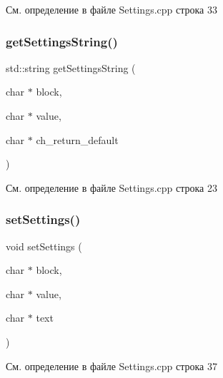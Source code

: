 См. определение в файле Settings.\+cpp строка 33

\mbox{\label{group__settingsh_ga3a0f1e87eb01bdd16c4a7e365aa283eb}} 
\subsubsection{\texorpdfstring{get\+Settings\+String()}{getSettingsString()}}
{\footnotesize\ttfamily std\+::string get\+Settings\+String (\begin{DoxyParamCaption}\item[{char $\ast$}]{block,  }\item[{char $\ast$}]{value,  }\item[{char $\ast$}]{ch\+\_\+return\+\_\+default }\end{DoxyParamCaption})}



См. определение в файле Settings.\+cpp строка 23

\mbox{\label{group__settingsh_ga463e32ccb37f9478b0e62ee0d21c5999}} 
\subsubsection{\texorpdfstring{set\+Settings()}{setSettings()}}
{\footnotesize\ttfamily void set\+Settings (\begin{DoxyParamCaption}\item[{char $\ast$}]{block,  }\item[{char $\ast$}]{value,  }\item[{char $\ast$}]{text }\end{DoxyParamCaption})}



См. определение в файле Settings.\+cpp строка 37

